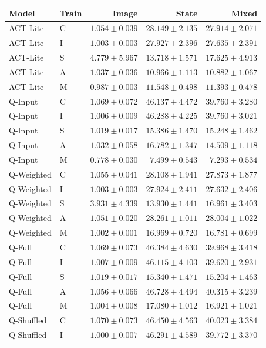 \documentclass[11pt,a4paper]{article}
\begin{document}
\begin{center}
\footnotesize
\begin{tabular}{llrrr}
\toprule
Model & Train & Image & State & Mixed \\
\midrule
ACT-Lite & C & $1.054\pm0.039$ & $28.149\pm2.135$ & $27.914\pm2.071$ \\
ACT-Lite & I & $1.003\pm0.003$ & $27.927\pm2.396$ & $27.635\pm2.391$ \\
ACT-Lite & S & $4.779\pm5.967$ & $13.718\pm1.571$ & $17.625\pm4.913$ \\
ACT-Lite & A & $1.037\pm0.036$ & $10.966\pm1.113$ & $10.882\pm1.067$ \\
ACT-Lite & M & $0.987\pm0.003$ & $11.548\pm0.498$ & $11.393\pm0.478$ \\
Q-Input & C & $1.069\pm0.072$ & $46.137\pm4.472$ & $39.760\pm3.280$ \\
Q-Input & I & $1.006\pm0.009$ & $46.288\pm4.225$ & $39.760\pm3.021$ \\
Q-Input & S & $1.019\pm0.017$ & $15.386\pm1.470$ & $15.248\pm1.462$ \\
Q-Input & A & $1.032\pm0.058$ & $16.782\pm1.347$ & $14.509\pm1.118$ \\
Q-Input & M & $0.778\pm0.030$ & $7.499\pm0.543$ & $7.293\pm0.534$ \\
Q-Weighted & C & $1.055\pm0.041$ & $28.108\pm1.941$ & $27.873\pm1.877$ \\
Q-Weighted & I & $1.003\pm0.003$ & $27.924\pm2.411$ & $27.632\pm2.406$ \\
Q-Weighted & S & $3.931\pm4.339$ & $13.930\pm1.441$ & $16.961\pm3.403$ \\
Q-Weighted & A & $1.051\pm0.020$ & $28.261\pm1.011$ & $28.004\pm1.022$ \\
Q-Weighted & M & $1.002\pm0.001$ & $16.969\pm0.720$ & $16.781\pm0.699$ \\
Q-Full & C & $1.069\pm0.073$ & $46.384\pm4.630$ & $39.968\pm3.418$ \\
Q-Full & I & $1.007\pm0.009$ & $46.115\pm4.103$ & $39.620\pm2.931$ \\
Q-Full & S & $1.019\pm0.017$ & $15.340\pm1.471$ & $15.204\pm1.463$ \\
Q-Full & A & $1.056\pm0.066$ & $46.728\pm4.494$ & $40.315\pm3.239$ \\
Q-Full & M & $1.004\pm0.008$ & $17.080\pm1.012$ & $16.921\pm1.021$ \\
Q-Shuffled & C & $1.070\pm0.073$ & $46.450\pm4.563$ & $40.023\pm3.384$ \\
Q-Shuffled & I & $1.000\pm0.007$ & $46.291\pm4.589$ & $39.772\pm3.370$ \\

\end{tabular}
\end{center}
\end{document}

